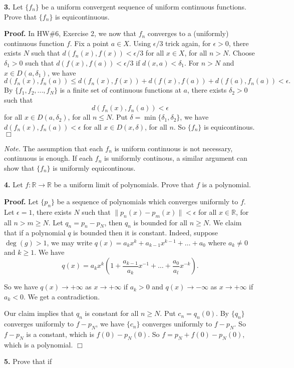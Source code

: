 \documentclass{article}
\begin{document}
    \textbf{3.} Let $\{f_n\}$ be a uniform convergent sequence of uniform
continuous functions. Prove that $\{f_n\}$ is equicontinuous.

\textbf{Proof.} In HW\#6, Exercise 2, we now that $f_n$ converges to a
(uniformly) continuous function $f$. Fix a point $a \in X$. Using
$\epsilon/3$ trick again, for $\epsilon > 0$, there exists $N$ such that
$d(f_n(x),f(x)) < \epsilon/3$ for all $x\in X$, for all $n > N$. Choose
$\delta_1 > 0$ such that $d(f(x),f(a)) < \epsilon /3$ if
$d(x,a) < \delta_1$. For $n > N$ and $x\in D(a,\delta_1)$, we have
\[d(f_n(x),f_n(a))\le d(f_n(x) ,f(x))+d(f(x),f(a))+d(f(a),f_n(a)) < \epsilon.\]
By $\{f_1,f_2,...,f_N\}$ is a finite set of continuous functions at $a$,
there exists $\delta_2>0$ such that \[d(f_n(x),f_n(a)) < \epsilon\] for
all $x\in D(a,\delta_2)$, for all $n\le N$. Put
$\delta = \min\{\delta_1,\delta_2\}$, we have
$d(f_n(x),f_n(a)) < \epsilon$ for all $x\in D(x,\delta)$, for all $n$.
So $\{f_n\}$ is equicontinous. $\Box$

\emph{Note.} The assumption that each $f_n$ is uniform continuous is not
necessary, continuous is enough. If each $f_n$ is uniformly continous, a
similar argument can show that $\{f_n\}$ is uniformly equicontinous.

    \textbf{4.} Let $f:\mathbb{R}\to\mathbb{R}$ be a uniform limit of
polynomials. Prove that $f$ is a polynomial.

\textbf{Proof.} Let $\{p_n\}$ be a sequence of polynomials which
converges uniformly to $f$. Let $\epsilon = 1$, there exists $N$ such
that $\|p_n(x) - p_m(x)\| < \epsilon$ for all $x\in \mathbb{R}$, for all
$n > m \ge N$. Let $q_n = p_n - p_N$, then $q_n$ is bounded for all
$n\ge N$. We claim that if a polynomial $q$ is bounded then it is
constant. Indeed, suppose $\deg(g) > 1$, we may write
$q(x) = a_kx^k + a_{k-1}x^{k-1} +\ldots + a_0$ where $a_k \ne 0$ and
$k\ge 1$. We have
\[q(x) = a_kx^k(1+\frac{a_{k-1}}{a_k}x^{-1} + \ldots + \frac{a_0}{a_l}x^{-k}).\]

So we have $q(x) \to +\infty$ as $x \to +\infty$ if $a_k > 0$ and
$q(x) \to -\infty$ as $x \to +\infty$ if $a_k < 0$. We get a
contradiction.

Our claim implies that $q_n$ is constant for all $n\ge N$. Put
$c_n = q_n(0)$. By $\{q_n\}$ converges uniformly to $f-p_N$, we have
$\{c_n\}$ converges uniformly to $f-p_N$. So $f-p_N$ is a constant,
which is $f(0) - p_N(0)$. So $f = p_N + f(0) - p_N(0)$, which is a
polynomial. $\Box$

    \textbf{5.} Prove that if
\end{document}
